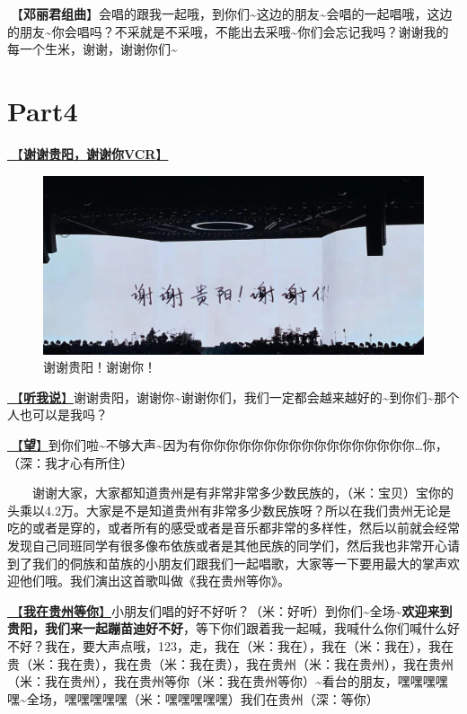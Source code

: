 \documentclass[]{ctexbook}
\begin{document}
🎵【\textbf{邓丽君组曲}】会唱的跟我一起哦，到你们\textasciitilde 这边的朋友\textasciitilde 会唱的一起唱哦，这边的朋友\textasciitilde 你会唱吗？不采就是不采哦，不能出去采哦\textasciitilde 你们会忘记我吗？谢谢我的每一个生米，谢谢，谢谢你们\textasciitilde{}

\section{Part4}\label{guiyang-20240713-part4}

\hyperref[thank-you-vcr]{🎥【\textbf{谢谢贵阳，谢谢你VCR}】}

\begin{figure}

{\centering \includegraphics[width=400pt]{img/guiyang20240713/thank-guiyang} 

}

\caption{谢谢贵阳！谢谢你！}\label{fig:unnamed-chunk-60}
\end{figure}

\hyperref[listen-to-me]{🎵【\textbf{听我说}】}谢谢贵阳，谢谢你\textasciitilde 谢谢你们，我们一定都会越来越好的\textasciitilde 到你们\textasciitilde 那个人也可以是我吗？

\hyperref[hope]{🎵【\textbf{望}】}到你们啦\textasciitilde 不够大声\textasciitilde 因为有你你你你你你你你你你你你你你你你你\ldots 你，（深：我才心有所住）

  谢谢大家，大家都知道贵州是有非常非常多少数民族的，（米：宝贝）宝你的头乘以4.2万。大家是不是知道贵州有非常多少数民族呀？所以在我们贵州无论是吃的或者是穿的，或者所有的感受或者是音乐都非常的多样性，然后以前就会经常发现自己同班同学有很多像布依族或者是其他民族的同学们，然后我也非常开心请到了我们的侗族和苗族的小朋友们跟我们一起唱歌，大家等一下要用最大的掌声欢迎他们哦。我们演出这首歌叫做《我在贵州等你》。

\hyperref[waitting-in-guizhou]{🎵【\textbf{我在贵州等你}】}小朋友们唱的好不好听？（米：好听）到你们\textasciitilde 全场\textasciitilde{}\textbf{欢迎来到贵阳，我们来一起蹦苗迪好不好}，等下你们跟着我一起喊，我喊什么你们喊什么好不好？我在，要大声点哦，123，走，我在（米：我在），我在（米：我在），我在贵（米：我在贵），我在贵（米：我在贵），我在贵州（米：我在贵州），我在贵州（米：我在贵州），我在贵州等你（米：我在贵州等你）\textasciitilde 看台的朋友，嘿嘿嘿嘿嘿\textasciitilde 全场，嘿嘿嘿嘿嘿（米：嘿嘿嘿嘿嘿）我们在贵州（深：等你）
\end{document}
